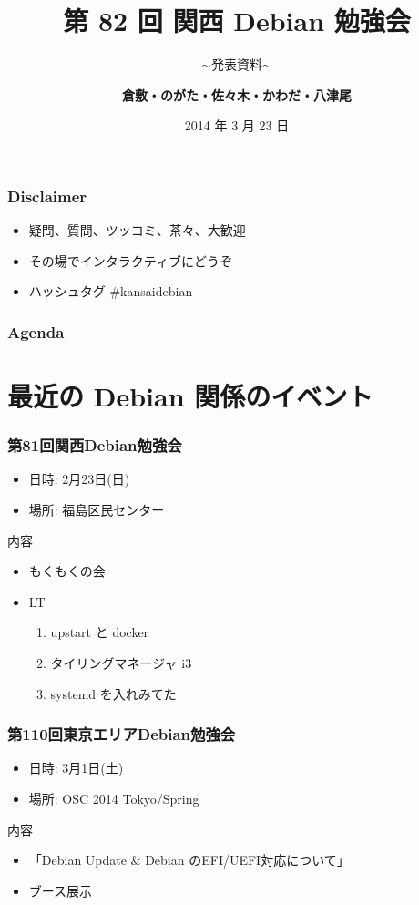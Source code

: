 \documentclass[cjk,dvipdfmx,10pt,compress,%
hyperref={bookmarks=true,bookmarksnumbered=true,bookmarksopen=false,%
colorlinks=false,%
pdftitle={第 82 回 関西 Debian 勉強会},%
pdfauthor={倉敷・のがた・佐々木・かわだ・八津尾},%
pdfsubject={資料},%
}]{beamer}
\title{第 82 回 関西 Debian 勉強会}
\subtitle{$\sim$発表資料$\sim$}
\author[かわだ てつたろう]{{\large\bf 倉敷・のがた・佐々木・かわだ・八津尾}}
\institute[Debian JP]{{\normalsize\tt 関西 Debian 勉強会}}
\date{{\small 2014 年 3 月 23 日}}
\begin{document}
\settitleslide
\begin{frame}
\titlepage
\end{frame}
\setdefaultslide

\begin{frame}[fragile]
  \frametitle{Disclaimer}
  \begin{itemize}
  \item 疑問、質問、ツッコミ、茶々、\alert{大歓迎}
  \item その場でインタラクティブにどうぞ
  \item ハッシュタグ \#kansaidebian
\end{itemize}
\end{frame}

\begin{frame}[fragile]
\frametitle{Agenda}

\tableofcontents

\end{frame}

\section{最近の Debian 関係のイベント}


\begin{frame}[fragile]
  \frametitle{第81回関西Debian勉強会}
  \begin{itemize}
  \item 日時: 2月23日(日)
  \item 場所: 福島区民センター
  \end{itemize}
  \begin{block}{内容}
    \begin{itemize}
    \item もくもくの会
    \item LT
      \begin{enumerate}
      \item upstart と docker
      \item タイリングマネージャ i3
      \item systemd を入れみてた
      \end{enumerate}
    \end{itemize}
  \end{block}
\end{frame}

\begin{frame}[fragile]
  \frametitle{第110回東京エリアDebian勉強会}
  \begin{itemize}
  \item 日時: 3月1日(土)
  \item 場所: OSC 2014 Tokyo/Spring
  \end{itemize}
  \begin{block}{内容}
    \begin{itemize}
    \item 「Debian Update \& Debian のEFI/UEFI対応について」
    \item ブース展示
    \end{itemize}
  \end{block}
\end{frame}
\end{document}
